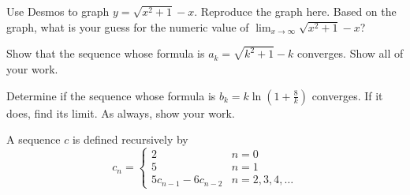 \documentclass[12pt,fleqn]{exam}
\begin{document}
\begin{questions} 
    
  \question [2] Use Desmos to graph $y = \sqrt{x^2+1} - x$. Reproduce
  the graph here.  Based on the graph, what is your guess for 
  the numeric value of $\displaystyle \lim_{x \to \infty} \sqrt{x^2+1} - x$?

  \begin{solution}[2.5in]
  \end{solution}

  \question [2] Show that the sequence whose formula is 
  $a_k = \sqrt{k^2+1} - k$ converges. Show all of your work.
  \begin{solution}%
  \end{solution}

  \newpage
  \question [2] Determine if the sequence whose formula is 
  $b_k = k \ln \left(1+\frac{8}{k} \right)$ converges. If it does, find its 
  limit. As always, show your work.
  \begin{solution}%
  \end{solution}

  \newpage
  \question A sequence $c$ is defined recursively by
  \begin{equation*}
      c_n = \begin{cases} 2 & n=0 \\
                          5 & n=1 \\
                          5 c_{n-1}-6 c_{n-2} & n=2,3,4,\dots
      \end{cases}
    \end{equation*}
        
\begin{solution}[2.5in]
\end{solution}

  \end{questions}
\end{document}
